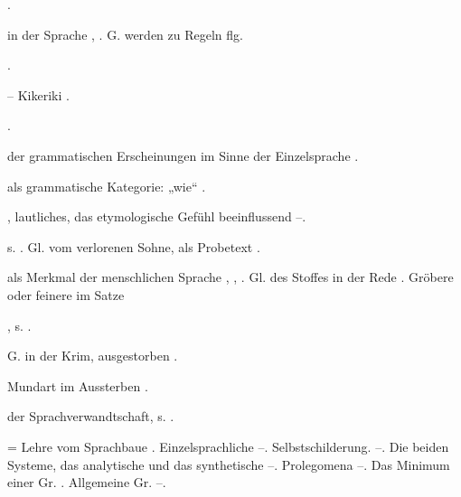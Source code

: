 \begin{register}
 \pageref{sp.107}.


 in der Sprache \pageref{sp.39}, \pageref{sp.182}. G. werden zu Regeln \pageref{sp.382} flg.

 \pageref{sp.160}.

 – Kikeriki \pageref{sp.208}.

 \pageref{sp.147}.


 der grammatischen Erscheinungen im Sinne der Einzelsprache \pageref{sp.90}.

 als grammatische Kategorie: „wie“ \pageref{sp.103}.


, lautliches, das etymologische Gefühl beeinflussend \pageref{sp.214}–\pageref{sp.216}.

 s. . Gl. vom verlorenen Sohne, als Probetext \pageref{sp.106}. 

 als Merkmal der menschlichen Sprache \pageref{sp.3}, \pageref{sp.5}, \sed{\pageref{sp.310},} \pageref{sp.346}. Gl. des Stoffes in der Rede \pageref{sp.324}. Gröbere oder feinere im Satze 


, s. .


  G. in der Krim, ausgestorben \pageref{sp.146}.

 Mundart im Aussterben \pageref{sp.146}.

 der Sprachverwandtschaft, s. .

 = Lehre vom Sprachbaue \pageref{sp.81}. Einzelsprachliche \pageref{sp.81}–\pageref{sp.121}. Selbstschilderung.  \pageref{sp.82}–\pageref{sp.83}. Die beiden Systeme, das analytische und das synthetische \pageref{sp.84}–\pageref{sp.86}. Prolegomena \pageref{sp.86}–\pageref{sp.88}. Das Minimum einer Gr. \pageref{sp.385}. Allgemeine Gr. \pageref{sp.479}–\pageref{sp.482}.


\end{register}
